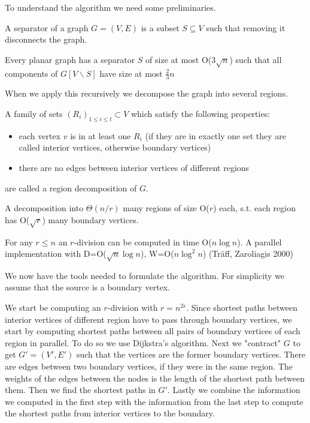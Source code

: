 To understand the algorithm we need some preliminaries.

\begin{Def} A separator of a graph $G=(V,E)$ is a subset $S\subseteq V$ such that removing it disconnects the graph.\end{Def}

\begin{thm} Every planar graph has a separator $S$ of size at most O($3\sqrt n$) such that all components of $G[V\backslash S]$ have size at most $\frac 23 n$\end{thm}

When we apply this recursively we decompose the graph into several regions.

\begin{Def} A family of sets $(R_i)_{1\leq i\leq t} \subset V$ which satisfy the following properties:

\begin{itemize}
\item each vertex $v$ is in at least one $R_i$ (if they are in exactly one set they are called interior vertices, otherwise boundary vertices)
\item there are no edges between interior vertices of different regions
\end{itemize}

are called a region decomposition of $G$.
\end{Def}

\begin{Def}[r-division] A decomposition into $\Theta(n/r)$ many regions of size O($r$) each, s.t. each region has O($\sqrt{r}$) many boundary vertices.
\end{Def}

\begin{thm}[Frederickson 1987] For any $r\leq n$ an $r$-division can be computed in time O($n\log n$). A parallel implementation with D=O($\sqrt n \log n$), W=O($n\log ^2n$) (Träff, Zaroliagis 2000) \end{thm} 

We now have the tools needed to formulate the algorithm. For simplicity we assume that the source is a boundary vertex.

We start be computing an $r$-division with $r=n^{2\epsilon}$. Since shortest paths between interior vertices of different region have to pass through boundary vertices, we start by computing shortest paths between all pairs of boundary vertices of each region in parallel. To do so we use Dijkstra's algorithm. Next we "contract" $G$ to get $G'=(V',E')$ such that the vertices are the former boundary vertices. There are edges between two boundary vertices, if they were in the same region. The weights of the edges between the nodes is the length of the shortest path between them. Then we find the shortest paths in $G'$. Lastly we combine the information we computed in the first step with the information from the last step to compute the shortest paths from interior vertices to the boundary.

